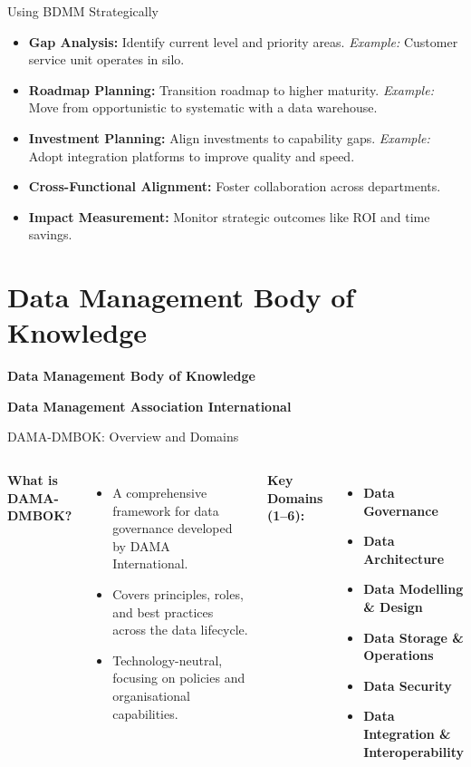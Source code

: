 \documentclass[aspectratio=169, table]{beamer}
\begin{document}
	
	\begin{frame}[fragile]{Using BDMM Strategically}
		\vspace{20pt}
		\begin{itemize}
			\item \textbf{Gap Analysis:} Identify current level and priority areas. \textit{Example:} Customer service unit operates in silo.
			\item \textbf{Roadmap Planning:} Transition roadmap to higher maturity. \textit{Example:} Move from opportunistic to systematic with a data warehouse.
			\item \textbf{Investment Planning:} Align investments to capability gaps. \textit{Example:} Adopt integration platforms to improve quality and speed.
			\item \textbf{Cross-Functional Alignment:} Foster collaboration across departments.
			\item \textbf{Impact Measurement:} Monitor strategic outcomes like ROI and time savings.
		\end{itemize}
	\end{frame}
	
		\section{Data Management Body of Knowledge}
	\begin{frame}{\hfill}
		\centering
		\Huge{\textbf{Data Management Body of Knowledge}}
		
		\vspace{20pt}
		\large{\textbf{Data Management Association International}}
	\end{frame}
	
	\begin{frame}[fragile]{DAMA-DMBOK: Overview and Domains}
		\vspace{20pt}
		\begin{columns}
			\textbf{What is DAMA-DMBOK?}
			\begin{itemize}
				\item A comprehensive framework for data governance developed by DAMA International.
				\item Covers principles, roles, and best practices across the data lifecycle.
				\item Technology-neutral, focusing on policies and organisational capabilities.
			\end{itemize}
			
			\textbf{Key Domains (1–6):}
			\begin{itemize}
				\item \textbf{Data Governance}
				\item \textbf{Data Architecture}
				\item \textbf{Data Modelling \& Design}
				\item \textbf{Data Storage \& Operations}
				\item \textbf{Data Security}
				\item \textbf{Data Integration \& Interoperability}
			\end{itemize}
		\end{columns}
	\end{frame}
	
\end{document}
